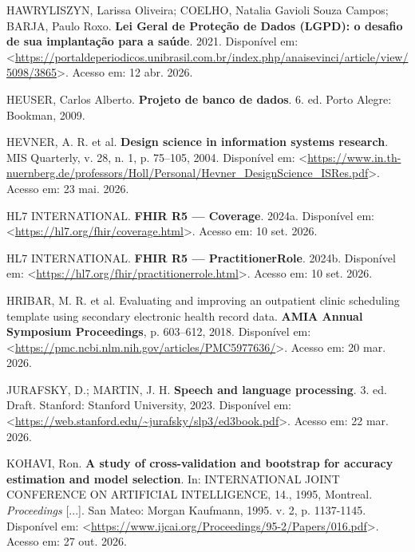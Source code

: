 \documentclass[12pt,a4paper]{extarticle}
\begin{document}
\vspace{0.5cm}\noindent
HAWRYLISZYN, Larissa Oliveira; COELHO, Natalia Gavioli Souza Campos; BARJA, Paulo Roxo. \textbf{Lei Geral de Proteção de Dados (LGPD): o desafio de sua implantação para a saúde}. 2021. Disponível em: <\url{https://portaldeperiodicos.unibrasil.com.br/index.php/anaisevinci/article/view/5098/3865}>. Acesso em: 12 abr. 2026.

\vspace{0.5cm}\noindent
HEUSER, Carlos Alberto. \textbf{Projeto de banco de dados}. 6. ed. Porto Alegre: Bookman, 2009.

\vspace{0.5cm}\noindent
HEVNER, A. R. et al. \textbf{Design science in information systems research}. MIS Quarterly, v. 28, n. 1, p. 75–105, 2004. Disponível em: <\url{https://www.in.th-nuernberg.de/professors/Holl/Personal/Hevner_DesignScience_ISRes.pdf}>. Acesso em: 23 mai. 2026.

\vspace{0.5cm}\noindent
HL7 INTERNATIONAL. \textbf{FHIR R5 — Coverage}. 2024a. Disponível em: <\url{https://hl7.org/fhir/coverage.html}>. Acesso em: 10 set. 2026.

\vspace{0.5cm}\noindent
HL7 INTERNATIONAL. \textbf{FHIR R5 — PractitionerRole}. 2024b. Disponível em: <\url{https://hl7.org/fhir/practitionerrole.html}>. Acesso em: 10 set. 2026.

\vspace{0.5cm}\noindent
HRIBAR, M. R. et al. Evaluating and improving an outpatient clinic scheduling template using secondary electronic health record data. \textbf{AMIA Annual Symposium Proceedings}, p. 603--612, 2018. Disponível em: <\url{https://pmc.ncbi.nlm.nih.gov/articles/PMC5977636/}>. Acesso em: 20 mar. 2026.

\vspace{0.5cm}\noindent
JURAFSKY, D.; MARTIN, J. H. \textbf{Speech and language processing}. 3. ed. Draft. Stanford: Stanford University, 2023. Disponível em: <\url{https://web.stanford.edu/~jurafsky/slp3/ed3book.pdf}>. Acesso em: 22 mar. 2026.

\vspace{0.5cm}\noindent
KOHAVI, Ron. \textbf{A study of cross-validation and bootstrap for accuracy estimation and model selection}. In: INTERNATIONAL JOINT CONFERENCE ON ARTIFICIAL INTELLIGENCE, 14., 1995, Montreal. \textit{Proceedings} [...]. San Mateo: Morgan Kaufmann, 1995. v. 2, p. 1137-1145. Disponível em: <\url{https://www.ijcai.org/Proceedings/95-2/Papers/016.pdf}>. Acesso em: 27 out. 2026.
\end{document}
